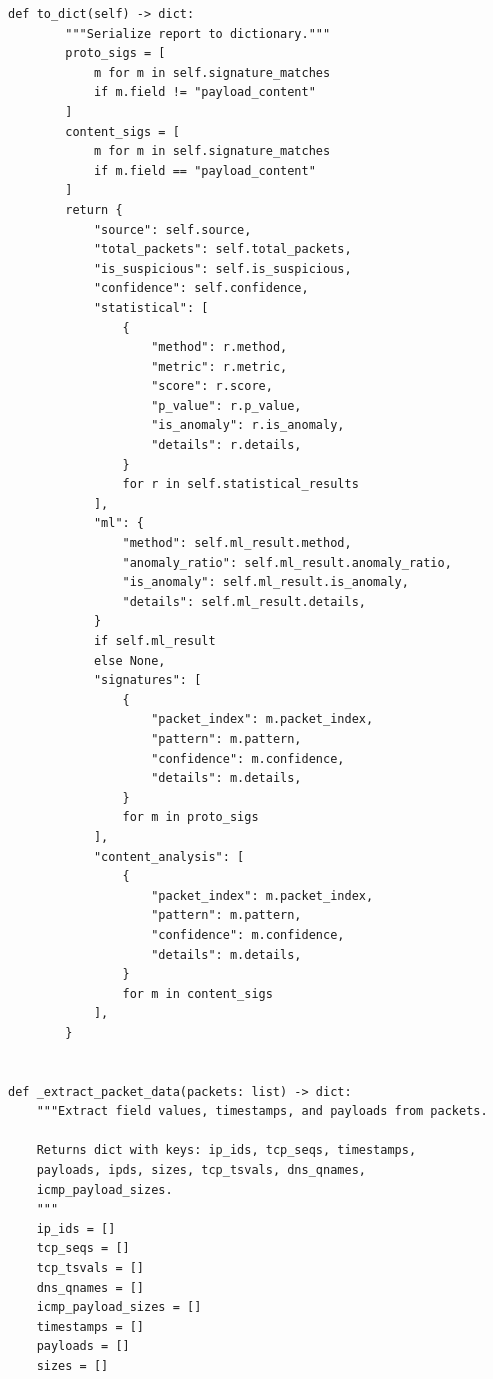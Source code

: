 \begin{lstlisting}[style=appendixcode]
    def to_dict(self) -> dict:
        """Serialize report to dictionary."""
        proto_sigs = [
            m for m in self.signature_matches
            if m.field != "payload_content"
        ]
        content_sigs = [
            m for m in self.signature_matches
            if m.field == "payload_content"
        ]
        return {
            "source": self.source,
            "total_packets": self.total_packets,
            "is_suspicious": self.is_suspicious,
            "confidence": self.confidence,
            "statistical": [
                {
                    "method": r.method,
                    "metric": r.metric,
                    "score": r.score,
                    "p_value": r.p_value,
                    "is_anomaly": r.is_anomaly,
                    "details": r.details,
                }
                for r in self.statistical_results
            ],
            "ml": {
                "method": self.ml_result.method,
                "anomaly_ratio": self.ml_result.anomaly_ratio,
                "is_anomaly": self.ml_result.is_anomaly,
                "details": self.ml_result.details,
            }
            if self.ml_result
            else None,
            "signatures": [
                {
                    "packet_index": m.packet_index,
                    "pattern": m.pattern,
                    "confidence": m.confidence,
                    "details": m.details,
                }
                for m in proto_sigs
            ],
            "content_analysis": [
                {
                    "packet_index": m.packet_index,
                    "pattern": m.pattern,
                    "confidence": m.confidence,
                    "details": m.details,
                }
                for m in content_sigs
            ],
        }


def _extract_packet_data(packets: list) -> dict:
    """Extract field values, timestamps, and payloads from packets.

    Returns dict with keys: ip_ids, tcp_seqs, timestamps,
    payloads, ipds, sizes, tcp_tsvals, dns_qnames,
    icmp_payload_sizes.
    """
    ip_ids = []
    tcp_seqs = []
    tcp_tsvals = []
    dns_qnames = []
    icmp_payload_sizes = []
    timestamps = []
    payloads = []
    sizes = []


\end{lstlisting}
